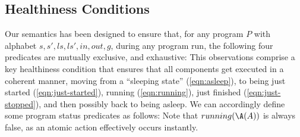 \subsection{Healthiness Conditions}

Our semantics has been designed
to ensure that,
for any program $P$ with alphabet $s,s',ls,ls',in,out,g$,
during any program run,
the following four predicates
are mutually exclusive, and exhaustive:
This observations comprise a key healthiness condition
that ensures that all  components get executed
in a coherent manner, moving from a ``sleeping state'' (\ref{eqn:asleep}),
to being just started (\ref{eqn:just-started}),
running (\ref{eqn:running}),
just finished (\ref{eqn:just-stopped}),
and then possibly back to being asleep.
We can accordingly define some program status predicates as follows:
Note that $running(\A(A))$ is always false,
as an atomic action effectively occurs instantly.
